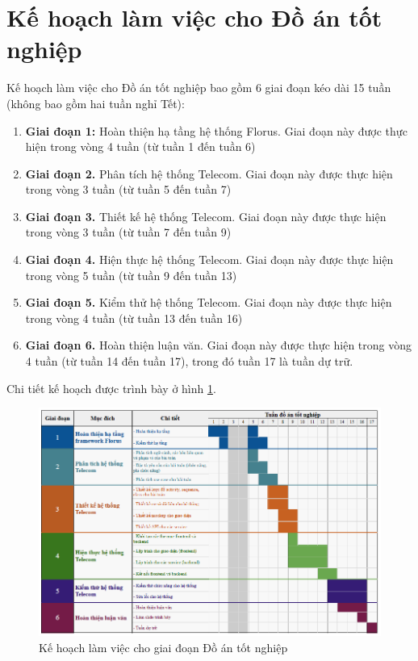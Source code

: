 

\section{Kế hoạch làm việc cho Đồ án tốt nghiệp}


Kế hoạch làm việc cho Đồ án tốt nghiệp bao gồm 6 giai đoạn kéo dài 15 tuần (không bao gồm hai tuần nghỉ Tết):

\begin{enumerate}
    \item \textbf{Giai đoạn 1:} Hoàn thiện hạ tầng hệ thống Florus. Giai đoạn này được thực hiện trong vòng 4 tuần (từ tuần 1 đến tuần 6)
    \item \textbf{Giai đoạn 2.} Phân tích hệ thống Telecom. Giai đoạn này được thực hiện trong vòng 3 tuần (từ tuần 5 đến tuần 7)
    \item \textbf{Giai đoạn 3.} Thiết kế hệ thống Telecom. Giai đoạn này được thực hiện trong vòng 3 tuần (từ tuần 7 đến tuần 9)
    \item \textbf{Giai đoạn 4.} Hiện thực hệ thống Telecom. Giai đoạn này được thực hiện trong vòng 5 tuần (từ tuần 9 đến tuần 13)
    \item \textbf{Giai đoạn 5.} Kiểm thử hệ thống Telecom. Giai đoạn này được thực hiện trong vòng 4 tuần (từ tuần 13 đến tuần 16)
    \item \textbf{Giai đoạn 6.} Hoàn thiện luận văn. Giai đoạn này được thực hiện trong vòng 4 tuần (từ tuần 14 đến tuần 17), trong đó tuần 17 là tuần dự trữ.
\end{enumerate}

Chi tiết kế hoạch được trình bày ở hình \ref{fig:plan}.


\begin{figure}
    \centering
    \setlength{\abovecaptionskip}{10pt plus 2pt minus 2pt}
    \includegraphics[scale=0.95]{images/gantt.png}
    \caption{Kế hoạch làm việc cho giai đoạn Đồ án tốt nghiệp}
    \label{fig:plan}
\end{figure}